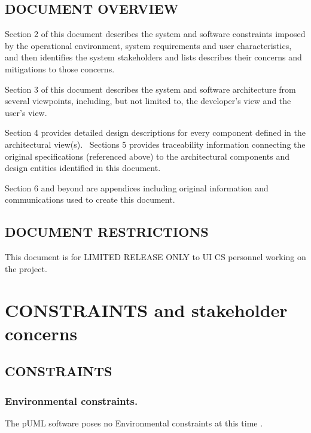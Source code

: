 \documentclass[twoside,letterpaper]{article}
\begin{document}
{\subsection{DOCUMENT OVERVIEW}

{\color{black}
Section 2 of this document describes the system and software constraints
imposed by the operational environment, system requirements and user
characteristics, and then identifies the system stakeholders and lists
describes their concerns and mitigations to those concerns.}

{\color{black}
Section 3 of this document describes the system and software
architecture from several viewpoints, including, but not limited to,
the developer{\textquoteright}s view and the user{\textquoteright}s
view.}

{\color{black}
Section 4 provides detailed design descriptions for every component
defined in the architectural view(s). \ Sections 5 provides
traceability information connecting the original specifications
(referenced above) to the architectural components and design entities
identified in this document.}

{\color{black}
Section 6 and beyond are appendices including original information and
communications used to create this document.}

\subsection[DOCUMENT
RESTRICTIONS]{\bfseries\color{black} DOCUMENT
RESTRICTIONS}

{\color{black}
This document is for LIMITED RELEASE ONLY to UI CS personnel working on
the project.}

\section{CONSTRAINTS and stakeholder concerns}

\subsection{CONSTRAINTS}

\subsubsection{Environmental constraints.}
{\color{black}
The pUML software poses no Environmental constraints at this time .
}

}
\end{document}
